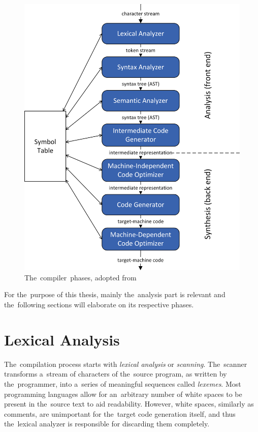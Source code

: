 \documentclass[
  digital, %
  table,   %
  lof,     %
  lot,     %
  oneside,
]{fithesis3}
\begin{document}
\begin{figure}[h!]
		\centering
			\includegraphics[scale=0.80]{img/compiler-phases}
		\caption{The~compiler~phases, adopted from~\cite{dragon-book}}
		\label{fig:compiler-phases}
\end{figure}

For the~purpose of this thesis, mainly the~analysis part is relevant and the~following sections will elaborate on its respective phases.

  \section{Lexical Analysis}
The~compilation process starts with \textit{lexical analysis} or \textit{scanning}. The~scanner transforms a~stream of characters of the~source program, as written by the~programmer, into a~series of meaningful sequences called \textit{lexemes}. Most programming languages allow for an~arbitrary number of white spaces to be present in the~source text to aid readability. However, white spaces, similarly as comments, are unimportant for the~target code generation itself, and thus the~lexical analyzer is responsible for discarding them completely.
\end{document}
